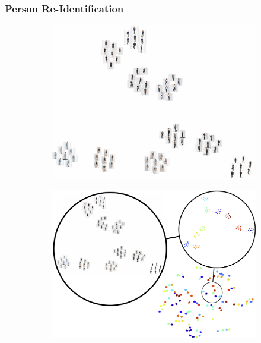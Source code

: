		\begin{frame}[t]
		\frametitle{Person Re-Identification}
			\begin{figure}[htp]
				\centering
				\begin{subfigure}{0.49\linewidth}
				\includegraphics[trim={0cm 0cm 0cm 0cm},clip, width=1.0\linewidth]{fig/factor/tsne_img}
				\end{subfigure}
				\begin{subfigure}{0.49\linewidth}
				\includegraphics[trim={0cm 0cm 0cm 0cm},clip, width=1.0\linewidth]{fig/factor/tsne_bubble}
				\end{subfigure}

\end{figure}
\end{frame}
